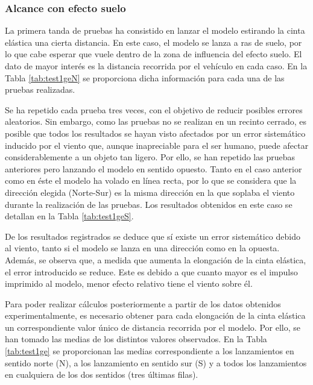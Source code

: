 \FloatBarrier

\subsubsection{Alcance con efecto suelo}
\label{sec:tests:results:ge}

La primera tanda de pruebas ha consistido en lanzar el modelo estirando la cinta elástica una cierta distancia. En este caso, el modelo se lanza a ras de suelo, por lo que cabe esperar que vuele dentro de la zona de influencia del efecto suelo. El dato de mayor interés es la distancia recorrida por el vehículo en cada caso. En la Tabla \ref{tab:test1geN} se proporciona dicha información para cada una de las pruebas realizadas.

Se ha repetido cada prueba tres veces, con el objetivo de reducir posibles errores aleatorios. Sin embargo, como las pruebas no se realizan en un recinto cerrado, es posible que todos los resultados se hayan visto afectados por un error sistemático inducido por el viento que, aunque inapreciable para el ser humano, puede afectar considerablemente a un objeto tan ligero. Por ello, se han repetido las pruebas anteriores pero lanzando el modelo en sentido opuesto. Tanto en el caso anterior como en éste el modelo ha volado en línea recta, por lo que se considera que la dirección elegida (Norte-Sur) es la misma dirección en la que soplaba el viento durante la realización de las pruebas. Los resultados obtenidos en este caso se detallan en la Tabla \ref{tab:test1geS}.

De los resultados registrados se deduce que sí existe un error sistemático debido al viento, tanto si el modelo se lanza en una dirección como en la opuesta. Además, se observa que, a medida que aumenta la elongación de la cinta elástica, el error introducido se reduce. Este es debido a que cuanto mayor es el impulso imprimido al modelo, menor efecto relativo tiene el viento sobre él.

Para poder realizar cálculos posteriormente a partir de los datos obtenidos experimentalmente, es necesario obtener para cada elongación de la cinta elástica un correspondiente valor único de distancia recorrida por el modelo. Por ello, se han tomado las medias de los distintos valores observados. En la Tabla \ref{tab:test1ge} se proporcionan las medias correspondiente a los lanzamientos en sentido norte (N), a los lanzamiento en sentido sur (S) y a todos los lanzamientos en cualquiera de los dos sentidos (tres últimas filas).

